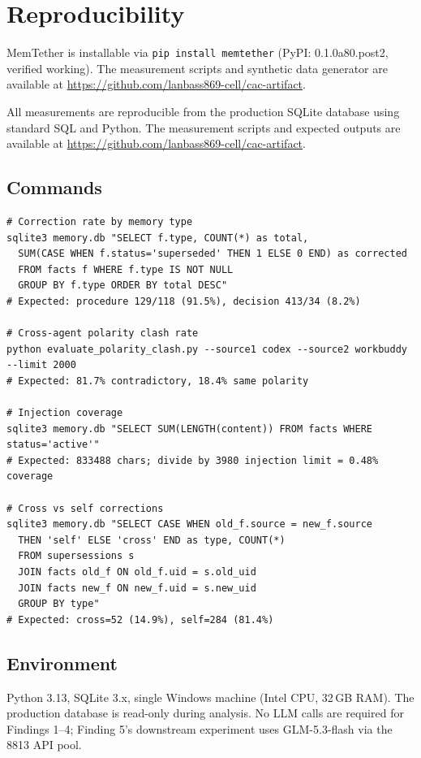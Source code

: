 \documentclass[11pt]{article}
\begin{document}
\section{Reproducibility}

MemTether is installable via \texttt{pip install memtether} (PyPI: 0.1.0a80.post2, verified working). The measurement scripts and synthetic data generator are available at \url{https://github.com/lanbass869-cell/cac-artifact}.
\label{sec:repro}

All measurements are reproducible from the production SQLite database using standard SQL and Python. The measurement scripts and expected outputs are available at \url{https://github.com/lanbass869-cell/cac-artifact}.

\subsection{Commands}

\begin{verbatim}
# Correction rate by memory type
sqlite3 memory.db "SELECT f.type, COUNT(*) as total,
  SUM(CASE WHEN f.status='superseded' THEN 1 ELSE 0 END) as corrected
  FROM facts f WHERE f.type IS NOT NULL
  GROUP BY f.type ORDER BY total DESC"
# Expected: procedure 129/118 (91.5%), decision 413/34 (8.2%)

# Cross-agent polarity clash rate
python evaluate_polarity_clash.py --source1 codex --source2 workbuddy --limit 2000
# Expected: 81.7% contradictory, 18.4% same polarity

# Injection coverage
sqlite3 memory.db "SELECT SUM(LENGTH(content)) FROM facts WHERE status='active'"
# Expected: 833488 chars; divide by 3980 injection limit = 0.48% coverage

# Cross vs self corrections
sqlite3 memory.db "SELECT CASE WHEN old_f.source = new_f.source
  THEN 'self' ELSE 'cross' END as type, COUNT(*)
  FROM supersessions s
  JOIN facts old_f ON old_f.uid = s.old_uid
  JOIN facts new_f ON new_f.uid = s.new_uid
  GROUP BY type"
# Expected: cross=52 (14.9%), self=284 (81.4%)
\end{verbatim}

\subsection{Environment}

Python 3.13, SQLite 3.x, single Windows machine (Intel CPU, 32\,GB RAM). The production database is read-only during analysis. No LLM calls are required for Findings 1--4; Finding 5's downstream experiment uses GLM-5.3-flash via the 8813 API pool.
\end{document}
